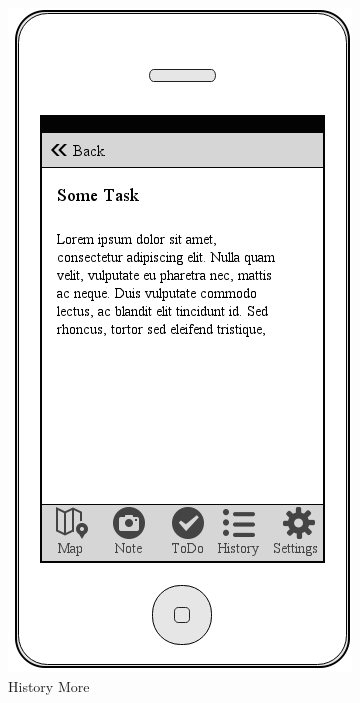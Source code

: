 \documentclass[12pt]{article}
\begin{document}
\begin{figure}[ht]
	\centering
	\includegraphics[width=\linewidth, height=0.4\textheight, keepaspectratio=true]{mockups/HistoryMore.png}
	\caption{History More}
	\endminipage\hfill
	\centering

\end{figure}
\end{document}
